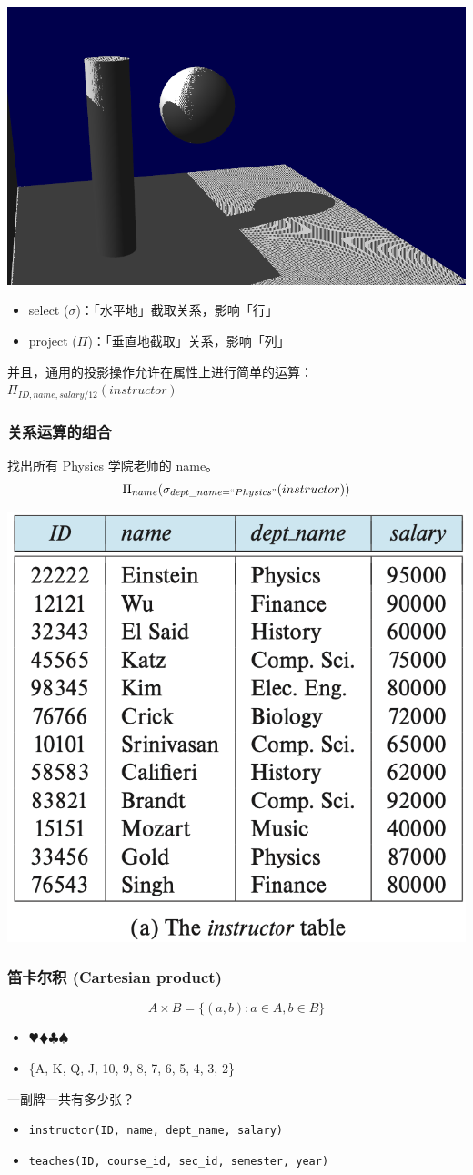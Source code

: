 \documentclass[aspectratio=169, 14pt]{beamer}
\begin{document}
\begin{frame}
    \begin{center}
        \includegraphics[width=.45\textwidth]{image/project}
    \end{center}

\begin{itemize}
    \item select ($\sigma$)：「水平地」截取关系，影响「行」
    \item project ($\Pi$)：「垂直地截取」关系，影响「列」
\end{itemize}
\pause
并且，通用的投影操作允许在属性上进行简单的运算：\large{\(\Pi_{ID, name, salary/12}(instructor)\)}
    
\end{frame}

\begin{frame}
    \frametitle{关系运算的组合}
    找出所有 Physics 学院老师的 name。
    {\large \[\Pi_{name}(\sigma_{dept\_name=``Physics"}(instructor))\]}
    \begin{center}
        \includegraphics[width=.55\textwidth, trim={0 4.4cm 0 0},clip]{table/instructor} 
    \end{center}

\end{frame}

\begin{frame}
    \frametitle{笛卡尔积 (Cartesian product)}
\[A \times B = \{(a, b): a \in A, b \in B\}\]
\pause
\begin{itemize}
    \item $\varheart\vardiamond\clubsuit\spadesuit$
    \item \{A, K, Q, J, 10, 9, 8, 7, 6, 5, 4, 3, 2\}
\end{itemize}
{\large {}} 一副牌一共有多少张？

\pause
\begin{itemize}
    \item \texttt{instructor(ID, name, dept\_name, salary)}
    \item \texttt{teaches(ID, course\_id, sec\_id, semester, year)}
   \end{itemize} 
\end{frame}
\end{document}
